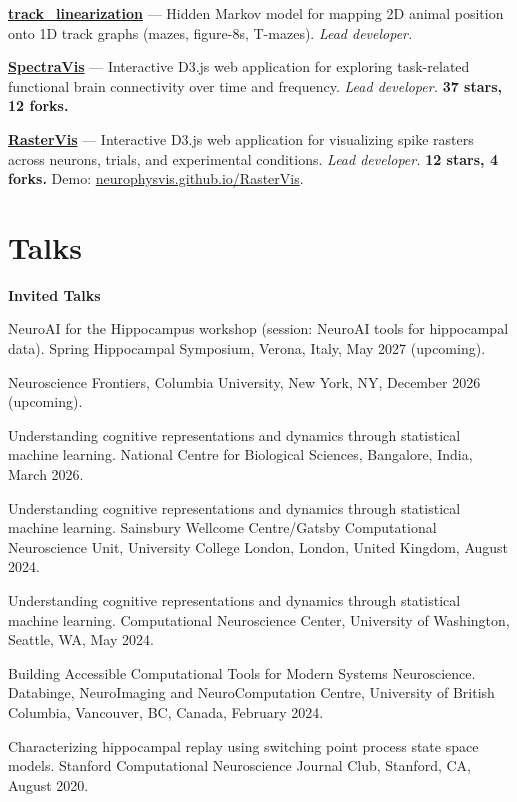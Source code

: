 \documentclass[margin,line,11pt]{res}
\newcommand*{\cvsubhead}[1]{\par\textbf{#1}\par\nobreak\vspace{-\parskip}}
\begin{document}
\begin{resume}
\href{https://github.com/LorenFrankLab/track_linearization}{\textbf{track\_linearization}} — Hidden Markov model for mapping 2D animal position onto 1D track graphs (mazes, figure-8s, T-mazes). \emph{Lead developer.}

\href{https://github.com/NeurophysVis/SpectraVis}{\textbf{SpectraVis}} — Interactive D3.js web application for exploring task-related functional brain connectivity over time and frequency. \emph{Lead developer.} \textbf{37 stars, 12 forks.}

\href{https://github.com/NeurophysVis/RasterVis}{\textbf{RasterVis}} — Interactive D3.js web application for visualizing spike rasters across neurons, trials, and experimental conditions. \emph{Lead developer.} \textbf{12 stars, 4 forks.} Demo: \href{https://neurophysvis.github.io/RasterVis/public/}{neurophysvis.github.io/RasterVis}.

\section{Talks}
\cvsubhead{Invited Talks}
NeuroAI for the Hippocampus workshop (session: NeuroAI tools for hippocampal data). Spring Hippocampal Symposium, Verona, Italy, May 2027 (upcoming).

Neuroscience Frontiers, Columbia University, New York, NY, December 2026 (upcoming).

Understanding cognitive representations and dynamics through statistical machine learning. National Centre for Biological Sciences, Bangalore, India, March 2026.

Understanding cognitive representations and dynamics through statistical machine learning. Sainsbury Wellcome Centre/Gatsby Computational Neuroscience Unit, University College London, London, United Kingdom, August 2024.

Understanding cognitive representations and dynamics through statistical machine learning. Computational Neuroscience Center, University of Washington, Seattle, WA, May 2024.

Building Accessible Computational Tools for Modern Systems Neuroscience. Databinge, NeuroImaging and NeuroComputation Centre, University of British Columbia, Vancouver, BC, Canada, February 2024.

Characterizing hippocampal replay using switching point process state space models. Stanford Computational Neuroscience Journal Club, Stanford, CA, August 2020.


\end{resume}
\end{document}
